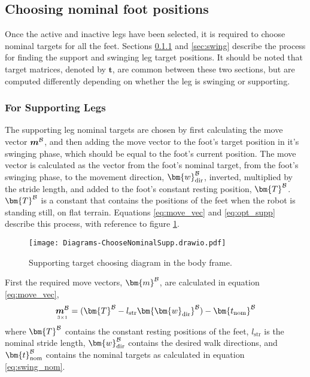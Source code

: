         \subsection{Choosing nominal foot positions}\label{sec:choosing_nominal} 
            Once the active and inactive legs have been selected, it is required to choose nominal targets for all the feet. Sections \ref{sec:support} and \ref{sec:swing}
            describe the process for finding the support and swinging leg target positions. It should be noted that target matrices, denoted by \(\bm{t}\), are common between these two sections, but are computed differently depending on whether the leg is swinging or supporting.
                
            \subsubsection{For Supporting Legs} \label{sec:support}
                The supporting leg nominal targets are chosen by first calculating the move vector \(\boldsymbol{m}^\fbody\), and then adding the move vector to the foot's target position in it's swinging phase, which should be equal to the foot's current position. The move vector is calculated as the vector from the foot's nominal target, from the foot's swinging phase, to the movement direction, \(\bm{w}_\text{dir}^\fbody\), inverted, multiplied by the stride length, and added to the foot's constant resting position, \(\bm{T}^\fbody\). \(\bm{T}^\fbody\) is  a constant that contains the positions of the feet when the robot is standing still, on flat terrain.
                Equations \ref{eq:move_vec} and \ref{eq:opt_supp} describe this process, with reference to figure \ref{fig:supp_targ}.
                \begin{figure}[h]
                    \centering
                    \texttt{[image: Diagrams-ChooseNominalSupp.drawio.pdf]}
                    \caption{Supporting target choosing diagram in the body frame.} 
                    \label{fig:supp_targ}
                \end{figure}

                \noindent
                First the required move vectors, \(\bm{m} ^\fbody\), are calculated in equation \ref{eq:move_vec},
                \begin{equation}\label{eq:move_vec}
                    \mdim{\boldsymbol{m}^\fbody}{3}{1} =  (\bm{T}^\fbody - l_\text{str} \bm{\bm{w}_\text{dir}}^\fbody) - \bm{t_\text{nom}}^\fbody
                \end{equation}
                where \(\bm{T}^\fbody\) contains the constant resting positions of the feet, \(l_\text{str}\) is the nominal stride length, \(\bm{w}_\text{dir}^\fbody\)
                contains the desired walk directions, and \(\bm{t}_\text{nom} ^\fbody\) contains the nominal targets as calculated in
                equation \ref{eq:swing_nom}.


